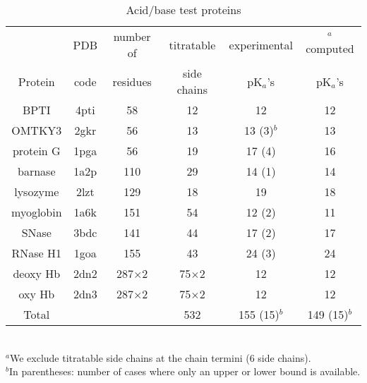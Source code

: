 \documentclass[a4paper,12pt]{article}
\newcommand{\pk}{pK$_a$}
\begin{document}
\begin{table}[h]
\caption{Acid/base test proteins}
\label{tab:proteins}
\begin{center}
\begin{tabular}{cccccc} \hline
          & PDB    & number of  & titratable    & experimental  & $^a$computed \\
Protein   & code   & residues   & side chains   & pK$_a$'s      & \pk's    \\ \hline
BPTI	  & 4pti   &	58	&	12	&	12      & 12 \\
OMTKY3	  & 2gkr   &	56	&	13	&    13 (3)$^b$ & 13 \\
protein G & 1pga   &	56	&	19	&	17 (4)  & 16 \\
barnase   & 1a2p   &	110	&	29	&	14 (1)  & 14 \\
lysozyme  & 2lzt   &	129	&	18	&	19      & 18 \\
myoglobin & 1a6k   &	151	&	54	&	12 (2)  & 11 \\
SNase     & 3bdc   &	141	& 	44	&	17 (2)  & 17 \\
RNase H1  & 1goa   &	155	&	43	&	24 (3)  & 24 \\
deoxy Hb  & 2dn2   & 287$\times$2 & 75$\times$2	&	12      & 12 \\
oxy Hb	  & 2dn3   & 287$\times$2 & 75$\times$2	&	12      & 12  \\ \hline
Total     &        &            &       532     &  155 (15)$^b$ & 149 (15)$^b$ \\ \hline
\end{tabular}
\\ {\footnotesize \noindent $^a$We exclude titratable side chains at the chain termini
(6 side chains). \\ $^b$In parentheses: number of cases where only an
upper or lower bound is available.}
\end{center}
\end{table}
\end{document}
